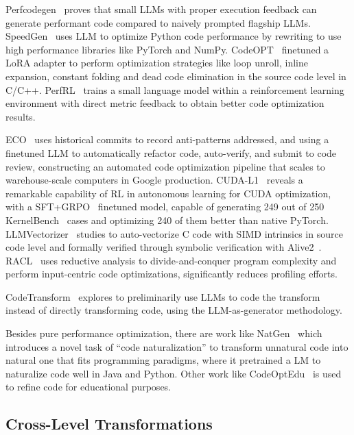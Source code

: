\documentclass[pdflatex,sn-mathphys-ay,twocolumn, a4paper]{sn-jnl}%
\theoremstyle{thmstyleone}%
\theoremstyle{thmstyletwo}%
\theoremstyle{thmstylethree}%
\begin{document}
Perfcodegen~\citep{52_peng2025perfcodegen} proves that small LLMs with proper execution feedback can generate performant code compared to naively prompted flagship LLMs.
SpeedGen~\citep{58_purschke2025speedgen} uses LLM to optimize Python code performance by rewriting to use high performance libraries like PyTorch and NumPy.
CodeOPT~\citep{63_xu2025efficient} finetuned a LoRA adapter to perform optimization strategies like loop unroll, inline expansion, constant folding and dead code elimination in the source code level in C/C++.
PerfRL~\citep{134_duan2025perfrlsmalllanguagemodel} trains a small language model within a reinforcement learning environment with direct metric feedback to obtain better code optimization results.


ECO~\citep{12_lin2025eco} uses historical commits to record anti-patterns addressed, and using a finetuned LLM to automatically refactor code, auto-verify, and submit to code review, constructing an automated code optimization pipeline that scales to warehouse-scale computers in Google production.
CUDA-L1~\citep{cudal1_2025_arxiv} reveals a remarkable capability of RL in autonomous learning for CUDA optimization, with a SFT+GRPO~\citep{grpo_2024_arxiv} finetuned model, capable of generating 249 out of 250 KernelBench~\citep{kernelbench_2025_icml} cases and optimizing 240 of them better than native PyTorch.
LLMVectorizer~\citep{47_llmvectorizer2025_cgo} studies to auto-vectorize C code with SIMD intrinsics in source code level and formally verified through symbolic verification with Alive2~\citep{alive2_2021_pldi}. RACL~\citep{46_wang2025_pldi} uses reductive analysis to divide-and-conquer program complexity and perform input-centric code optimizations, significantly reduces profiling efforts.

CodeTransform~\citep{178_cummins2024donttransformcodecode} explores to preliminarily use LLMs to code the transform instead of directly transforming code, using the LLM-as-generator methodology.

Besides pure performance optimization, there are work like NatGen~\citep{172_chakraborty2022natgen} which introduces a novel task of ``code naturalization'' to transform unnatural code into natural one that fits programming paradigms, where it pretrained a LM to naturalize code well in Java and Python. Other work like CodeOptEdu~\citep{54_rong2025integrating} is used to refine code for educational purposes.

\subsection{Cross-Level Transformations}
\end{document}
